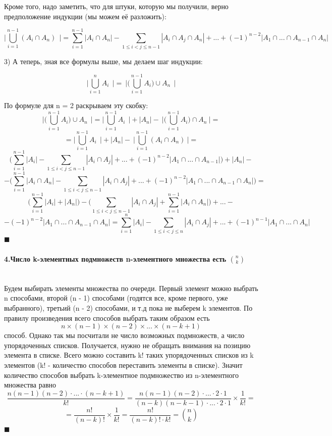 \documentclass[a4paper, 12pt]{article}
\newcommand{\parag}[1]{\paragraph{#1}\mbox{}\\}
\begin{document}
Кроме того, надо заметить, что для штуки, которую мы получили, верно предположение индукции (мы можем её разложить):

\[
    \Big|\underset{i = 1}{\overset{n - 1}{\bigcup}}(A_{i} \cap A_{n})\ \ \Big| =
    \underset{i=1}{\overset{n - 1}{\sum}}|A_{i} \cap A_{n}| -
    \underset{1 \leqslant i < j \leqslant n - 1}{\sum} |A_{i} \cap A_{j} \cap A_{n}|+
    ... +
    (-1)^{n-2} |A_{1} \cap ... \cap A_{n-1} \cap A_{n}|
\]

3) А теперь, зная все формулы выше, мы делаем шаг индукции:

\[
    \Big|\underset{i = 1}{\overset{n}{\bigcup}}A_{i}\ \ \Big| =\
    \Big|\Big(\underset{i = 1}{\overset{n - 1}{\bigcup}}A_{i}\Big)\cup A_{n}\ \ \Big|
\]

По формуле для n = 2 раскрываем эту скобку:
\[
    \Big|\Big(\underset{i = 1}{\overset{n - 1}{\bigcup}}A_{i}\Big)\cup A_{n}\ \ \Big| =
    \Big|\underset{i = 1}{\overset{n-1}{\bigcup}}A_{i}\ \ \Big| +
    |A_{n}| -\ 
    \Big|\Big(\overset{n-1}{\underset{i=1}{\bigcup}}A_{i}\Big) \cap A_{n}\ \Big| =
\]
\[
    = \Big|\underset{i = 1}{\overset{n-1}{\bigcup}}A_{i}\ \ \Big| +
    |A_{n}| -\ 
    \Big|\overset{n-1}{\underset{i=1}{\bigcup}}(A_{i} \cap A_{n})\ \Big| =
\]
\[
    \Bigg( \underset{i=1}{\overset{n - 1}{\sum}}|A_{i}| -
    \underset{1 \leqslant i < j \leqslant n - 1}{\sum} |A_{i} \cap A_{j}|+
    ... +
    (-1)^{n-2} |A_{1} \cap ... \cap A_{n-1}| \Bigg) + |A_{n}| -
\]
\[
    - \Bigg( \underset{i=1}{\overset{n - 1}{\sum}}|A_{i} \cap A_{n}| -
    \underset{1 \leqslant i < j \leqslant n - 1}{\sum} |A_{i} \cap A_{j}|+
    ... +
    (-1)^{n-2} |A_{1} \cap ... \cap A_{n-1} \cap A_{n}| \Bigg) =
\]
\[
    \Big(\underset{i=1}{\overset{n - 1}{\sum}}|A_{i}| + |A_{n}| \Big) -
    \Bigg( \underset{1 \leqslant i < j \leqslant n - 1}{\sum} |A_{i} \cap A_{j}| +  \underset{i=1}{\overset{n - 1}{\sum}}|A_{i} \cap A_{n}| \Bigg) + ... -
\]
\[
    -(-1)^{n-2} |A_{1} \cap ... \cap A_{n-1} \cap A_{n}| = \underset{i=1}{\overset{n}{\sum}}|A_{i}| -
    \underset{1 \leqslant i < j \leqslant n}{\sum} |A_{i} \cap A_{j}|+
    ... +
    (-1)^{n-1} |A_{1} \cap ... \cap A_{n}|
\]
$\blacksquare$

\parag{4.Число k-элементных подмножеств n-элементного множества есть ${n \choose k}$}
Будем выбирать элементы множества по очереди. Первый элемент можно выбрать n способами, второй (n - 1) способами (годятся все, кроме первого, уже выбранного), третьий (n - 2) способами, и т.д пока не выберем k элементов. По правилу произведения всего способов выбрать таким образом есть
\[
    n \times (n - 1) \times (n - 2) \times ... \times (n - k + 1)
\]
способ. Однако так мы посчитали не число возможных подмножеств, а число упорядоченных списков. Получается, нужно не обращать внимания на позицию элемента в списке. Всего можно составить k! таких упорядоченных списков из k элементов (k! - количество способов переставить элементы в списке). Значит количество способов выбрать k-элементное подмножество из n-элементного множества равно 
\[
    \frac{n(n-1)(n-2)\cdot...\cdot(n-k+1)}{k!} =
    \frac{n(n-1)(n-2)\cdot...\cdot2\cdot1}{(n-k)(n-k-1)\cdot...\cdot2\cdot1} \times \frac{1}{k!} = 
\]
\[
    = \frac{n!}{(n-k)!} \times \frac{1}{k!} = \frac{n!}{(n-k)!\cdot k!} = {n \choose k}
\]
$\blacksquare$
\end{document}
